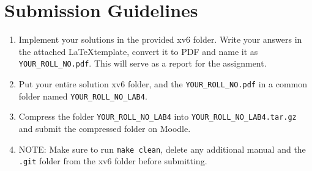 \documentclass[11pt]{exam}
\begin{document}
\section*{Submission Guidelines}  
\begin{enumerate}
    \item Implement your solutions in the provided xv6 folder. Write your answers in the attached \LaTeX template, convert it to PDF and name it as \texttt{YOUR\_ROLL\_NO.pdf}. This will serve as a report for the assignment.
    \item Put your entire solution xv6 folder, and the \texttt{YOUR\_ROLL\_NO.pdf} in a common folder named \texttt{YOUR\_ROLL\_NO\_LAB4}. 
    \item Compress the folder \texttt{YOUR\_ROLL\_NO\_LAB4} into \texttt{YOUR\_ROLL\_NO\_LAB4.tar.gz} and submit the compressed folder on Moodle.
    \item NOTE: Make sure to run \texttt{make clean}, delete any additional manual and the \texttt{.git} folder from the xv6 folder before submitting.
\end{enumerate}
\end{document}
